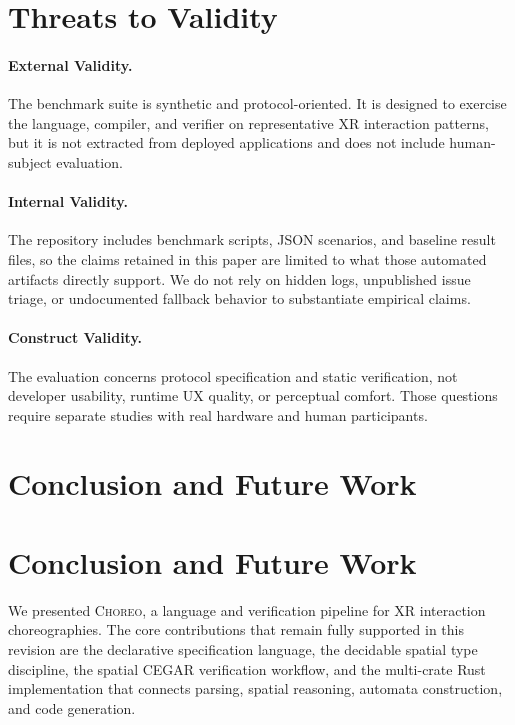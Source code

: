 \documentclass[11pt,a4paper]{article}
\begin{document}
\section{Threats to Validity}\label{sec:threats}

\paragraph{External Validity.}
The benchmark suite is synthetic and protocol-oriented.  It is designed
to exercise the language, compiler, and verifier on representative XR
interaction patterns, but it is not extracted from deployed
applications and does not include human-subject evaluation.

\paragraph{Internal Validity.}
The repository includes benchmark scripts, JSON scenarios, and baseline
result files, so the claims retained in this paper are limited to what
those automated artifacts directly support.  We do not rely on hidden
logs, unpublished issue triage, or undocumented fallback behavior to
substantiate empirical claims.

\paragraph{Construct Validity.}
The evaluation concerns protocol specification and static verification,
not developer usability, runtime UX quality, or perceptual comfort.
Those questions require separate studies with real hardware and human
participants.

\section{Conclusion and Future Work}

\section{Conclusion and Future Work}\label{sec:conclusion}

We presented \textsc{Choreo}, a language and verification pipeline for
XR interaction choreographies.  The core contributions that remain
fully supported in this revision are the declarative specification
language, the decidable spatial type discipline, the spatial CEGAR
verification workflow, and the multi-crate Rust implementation that
connects parsing, spatial reasoning, automata construction, and code
generation.
\end{document}

